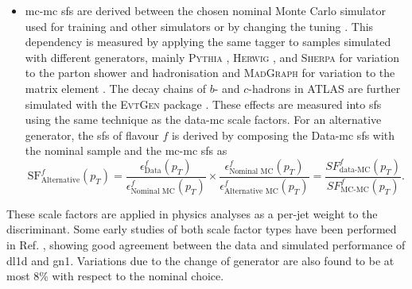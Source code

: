 \begin{itemize}[leftmargin=*]
  \item \gls{mc}-\gls{mc} \glspl{sf} are derived between the chosen nominal Monte Carlo simulator used for training and other simulators or by changing the tuning \cite{ATL-PHYS-PUB-2020-009}. This dependency is measured by applying the same tagger to samples simulated with different generators, mainly \textsc{Pythia} \cite{SJOSTRAND2015159}, \textsc{Herwig} \cite{bellm2017herwig}, and \textsc{Sherpa} \cite{sherpa2.2paper} for variation to the parton shower and hadronisation and \textsc{MadGraph} for variation to the matrix element \cite{madgraph}. The decay chains of $b$- and $c$-hadrons in ATLAS are further simulated with the \textsc{EvtGen} package \cite{LANGE2001152}. These effects are measured into \glspl{sf} using the same technique as the data-\gls{mc} scale factors. For an alternative generator, the \glspl{sf} of flavour $f$ is derived by composing the Data-\gls{mc} \glspl{sf} with the nominal sample and the \gls{mc}-\gls{mc} \glspl{sf} as \[\textrm{SF}^f_{\textrm{Alternative}}(p_T) = \frac{\epsilon^f_{\textrm{Data}}(p_T)}{\epsilon^f_{\textrm{Nominal MC}}(p_T)} \times \frac{\epsilon^f_{\textrm{Nominal MC}}(p_T)}{\epsilon^f_{\textrm{Alternative MC}}(p_T)} = \frac{SF^f_{\textrm{data-MC}}(p_T)}{SF^f_{\textrm{MC-MC}}(p_T)}.\] 
\end{itemize}
These scale factors are applied in physics analyses as a per-jet weight to the discriminant. Some early studies of both scale factor types have been performed in Ref. \cite{ATL-PLOT-FTAG-2023-01}, showing good agreement between the data and simulated performance of \gls{dl1d} and \gls{gn1}. Variations due to the change of generator are also found to be at most 8\% with respect to the nominal choice.

